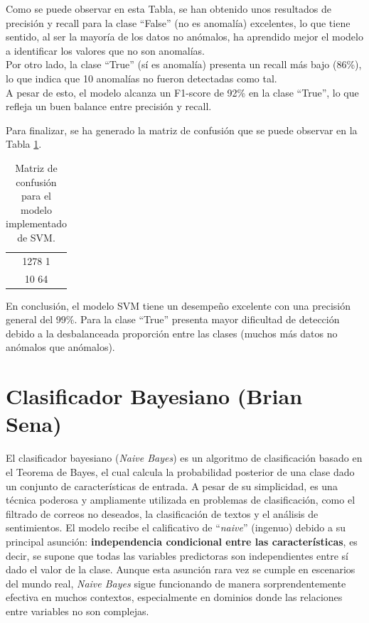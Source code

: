 \documentclass[12pt,letterpaper]{article}
\begin{document}
Como se puede observar en esta Tabla, se han obtenido unos resultados de precisión y recall para la clase ``False'' (no es anomalía) excelentes, lo que tiene sentido, al ser la mayoría de los datos no anómalos, ha aprendido mejor el modelo a identificar los valores que no son anomalías.\\
Por otro lado, la clase ``True'' (sí es anomalía) presenta un recall más bajo (86\%), lo que indica que 10 anomalías no fueron detectadas como tal.\\
A pesar de esto, el modelo alcanza un F1-score de 92\% en la clase ``True'', lo que refleja un buen balance entre precisión y recall.

Para finalizar, se ha generado la matriz de confusión que se puede observar en la Tabla \ref{tab:confusion-SVM}.
\begin{table}[htp]
    \centering
    \begin{tabular}{|c|}
    \hline
    1278 \hspace{8mm} 1 \\ 
    10 \hspace{10mm} 64 \\ \hline
    \end{tabular}
    \caption{Matriz de confusión para el modelo implementado de SVM.}
    \label{tab:confusion-SVM}
\end{table}

En conclusión, el modelo SVM tiene un desempeño excelente con una precisión general del 99\%. Para la clase ``True'' presenta mayor dificultad de detección debido a la desbalanceada proporción entre las clases (muchos más datos no anómalos que anómalos).


\section{Clasificador Bayesiano (Brian Sena)}
El clasificador bayesiano (\textit{Naive Bayes}) es un algoritmo de clasificación basado en el Teorema de Bayes, el cual calcula la probabilidad posterior de una clase dado un conjunto de características de entrada. 
A pesar de su simplicidad, es una técnica poderosa y ampliamente utilizada en problemas de clasificación, como el filtrado de correos no deseados, la clasificación de textos y el análisis de sentimientos.
El modelo recibe el calificativo de ``\textit{naive}'' (ingenuo) debido a su principal asunción: \textbf{independencia condicional entre las características}, es decir, se supone que todas las variables predictoras son independientes entre sí dado el valor de la clase. 
Aunque esta asunción rara vez se cumple en escenarios del mundo real, \textit{Naive Bayes} sigue funcionando de manera sorprendentemente efectiva en muchos contextos, especialmente en dominios donde las relaciones entre variables no son complejas.
\end{document}
